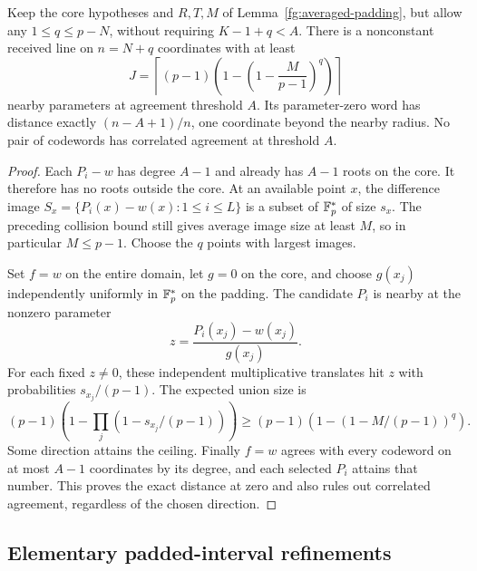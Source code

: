 

\begin{lemma}\label{fg:far-padding}
Keep the core hypotheses and $R,T,M$ of Lemma~\ref{fg:averaged-padding},
but allow any $1\le q\le p-N$, without requiring $K-1+q<A$.
There is a nonconstant received line on $n=N+q$ coordinates with at least
\begin{equation}\label{fg:far-count}
 J=\left\lceil(p-1)\left(1-\left(1-\frac{M}{p-1}\right)^q\right)\right\rceil
\end{equation}
nearby parameters at agreement threshold $A$. Its parameter-zero word
has distance exactly $(n-A+1)/n$, one coordinate beyond the nearby
radius. No pair of codewords has correlated agreement at threshold $A$.
\end{lemma}
\begin{proof}
Each $P_i-w$ has degree $A-1$ and already has $A-1$ roots on the core.
It therefore has no roots outside the core. At an available point $x$,
the difference image $S_x=\{P_i(x)-w(x):1\le i\le L\}$ is a subset
of $\mathbb F_p^*$ of size $s_x$. The preceding collision bound still gives
average image size at least $M$, so in particular $M\le p-1$.
Choose the $q$ points with largest images.

Set $f=w$ on the entire domain, let $g=0$ on the core, and choose
$g(x_j)$ independently uniformly in $\mathbb F_p^*$ on the padding.
The candidate $P_i$ is nearby at the nonzero parameter
\[
 z=\frac{P_i(x_j)-w(x_j)}{g(x_j)}.
\]
For each fixed $z\ne0$, these independent multiplicative translates
hit $z$ with probabilities $s_{x_j}/(p-1)$. The expected union size is
\[
 (p-1)\left(1-\prod_j(1-s_{x_j}/(p-1))\right)
 \ge(p-1)\left(1-(1-M/(p-1))^q\right).
\]
Some direction attains the ceiling. Finally $f=w$ agrees with every
codeword on at most $A-1$ coordinates by its degree, and each selected
$P_i$ attains that number. This proves the exact distance at zero and
also rules out correlated agreement, regardless of the chosen direction.
\end{proof}





\subsection{Elementary padded-interval refinements}

